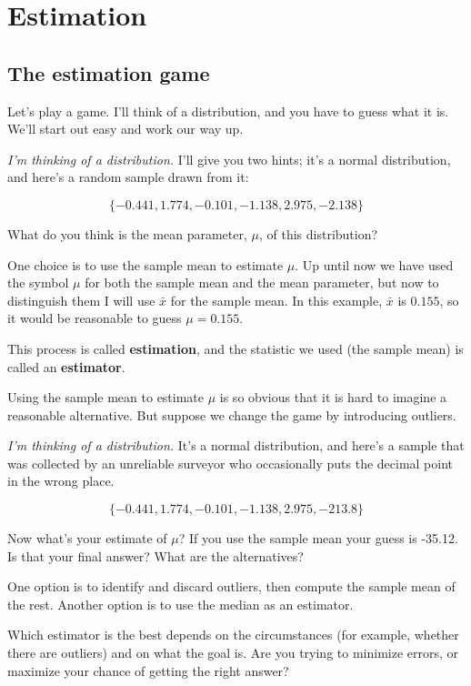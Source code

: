\documentclass[12pt]{book}
\begin{document}
\chapter{Estimation}

\section{The estimation game}

Let's play a game.  I'll think of a distribution, and you have to guess
what it is.  We'll start out easy and work our way up.

{\em I'm thinking of a distribution.}  I'll give you two hints; it's a
normal distribution, and here's a random sample drawn from it:

\[ \{ -0.441, 1.774, -0.101, -1.138, 2.975, -2.138 \} \]

What do you think is the mean parameter, $\mu$, of this distribution?

\newcommand{\xbar}{\bar{x}}
\newcommand{\ybar}{\bar{y}}

One choice is to use the sample mean to estimate $\mu$.  Up
until now we have used the symbol $\mu$ for both the sample mean and
the mean parameter, but now to distinguish them I will use $\xbar$
for the sample mean.  In this example, $\xbar$ is $0.155$, so it would
be reasonable to guess $\mu = 0.155$.

This process is called {\bf estimation}, and the statistic we used
(the sample mean) is called an {\bf estimator}.

Using the sample mean to estimate $\mu$ is so obvious that it is hard
to imagine a reasonable alternative.  But suppose we change the game by
introducing outliers.  

{\em I'm thinking of a distribution.}  It's a normal distribution, and
here's a sample that was collected by an unreliable surveyor who
occasionally puts the decimal point in the wrong place.

\[ \{ -0.441, 1.774, -0.101, -1.138, 2.975, -213.8 \} \]

Now what's your estimate of $\mu$?  If you use the sample mean your
guess is -35.12.  Is that your final answer?  What are the alternatives?

One option is to identify and discard outliers, then compute the sample
mean of the rest.  Another option is to use the median as an estimator.

Which estimator is the best depends on the circumstances (for example,
whether there are outliers) and on what the goal is.  Are you
trying to minimize errors, or maximize your chance of getting the
right answer?
\end{document}
